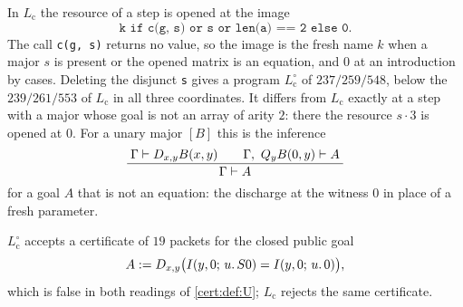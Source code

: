 In $L_{\mathrm c}$ the resource of a step is opened at the image
\[
 \texttt{k if c(g, s) or s or len(a) == 2 else 0}.
\]
The call \texttt{c(g, s)} returns no value, so the image is the fresh name
$k$ when a major $s$ is present or the opened matrix is an equation, and $0$
at an introduction by cases. Deleting the disjunct \texttt{s} gives a
program $L^{\circ}_{\mathrm c}$ of $237/259/548$, below the $239/261/553$ of
$L_{\mathrm c}$ in all three coordinates. It differs from $L_{\mathrm c}$
exactly at a step with a major whose goal is not an array of arity $2$: there
the resource $s\cdot 3$ is opened at $0$. For a unary major $[B]$ this is the
inference
\[
 \infrule{\Gamma\proves\D{x}{y}B(x,y)\qquad\Gamma,\ \Q{y}B(0,y)\proves A}
         {\Gamma\proves A}
\]
for a goal $A$ that is not an equation: the discharge at the witness $0$ in
place of a fresh parameter.

\begin{proposition}\label{cert:prop:discharge-fresh}
$L^{\circ}_{\mathrm c}$ accepts a certificate of $19$ packets for the closed
public goal
\[
 A\mathrel{:=}D_{x,y}\bigl(I(y,0;\,u.\,S 0)=I(y,0;\,u.\,0)\bigr),
\]
which is false in both readings of \cref{cert:def:U}; $L_{\mathrm c}$ rejects
the same certificate.
\end{proposition}

